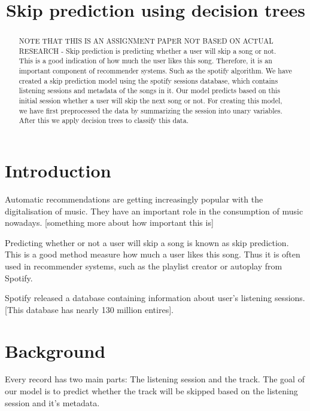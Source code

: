 \documentclass[conference]{IEEEtran}
\begin{document}
\title{Skip prediction using decision trees\\}

\author{
}

\maketitle

\begin{abstract}
	NOTE THAT THIS IS AN ASSIGNMENT PAPER NOT BASED ON ACTUAL RESEARCH - 
	Skip prediction is predicting whether a user will skip a song or not. 
	This is a good indication of how much the user likes this song.
	Therefore, it is an important component of recommender systems. Such as the spotify algorithm. 
	We have created a skip prediction model using the spotify sessions database, 
	which contains listening sessions and metadata of the songs in it. 
	Our model predicts based on this initial session whether a user will skip the next song or not.
	For creating this model, we have first preprocessed the data by summarizing the session into unary variables. 
	After this we apply decision trees to classify this data.
\end{abstract}

\section{Introduction}
Automatic recommendations are getting increasingly popular with the digitalisation of music. They have an important role in the consumption of music nowadays. [something more about how important this is]

Predicting whether or not a user will skip a song is known as skip prediction. 
This is a good method measure how much a user likes this song. 
Thus it is often used in recommender systems, 
such as the playlist creator or autoplay from Spotify. 

Spotify released a database containing information about user's listening sessions. 
[This database has nearly 130 million entires]. 

\section{Background}
Every record has two main parts: The listening session and the track. 
The goal of our model is to predict whether the track will be skipped based on the listening session and it's metadata.
\end{document}
